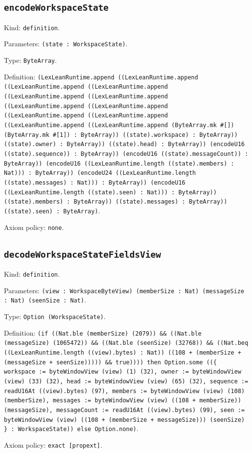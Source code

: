 \documentclass[11pt]{article}
\begin{document}
\subsection*{\texttt{encodeWorkspaceState}}
\noindent Kind: \texttt{definition}.\par
\noindent Parameters: \texttt{(state : WorkspaceState)}.\par
\noindent Type: \texttt{ByteArray}.\par
\noindent Definition: \texttt{(LexLeanRuntime.append ((LexLeanRuntime.append ((LexLeanRuntime.append ((LexLeanRuntime.append ((LexLeanRuntime.append ((LexLeanRuntime.append ((LexLeanRuntime.append ((LexLeanRuntime.append ((LexLeanRuntime.append ((LexLeanRuntime.append ((LexLeanRuntime.append ((LexLeanRuntime.append (ByteArray.mk \#[]) (ByteArray.mk \#[1]) : ByteArray)) ((state).workspace) : ByteArray)) ((state).owner) : ByteArray)) ((state).head) : ByteArray)) (encodeU16 ((state).sequence)) : ByteArray)) (encodeU16 ((state).messageCount)) : ByteArray)) (encodeU16 ((LexLeanRuntime.length ((state).members) : Nat))) : ByteArray)) (encodeU24 ((LexLeanRuntime.length ((state).messages) : Nat))) : ByteArray)) (encodeU16 ((LexLeanRuntime.length ((state).seen) : Nat))) : ByteArray)) ((state).members) : ByteArray)) ((state).messages) : ByteArray)) ((state).seen) : ByteArray)}.\par
\noindent Axiom policy: \texttt{none}.\par
\subsection*{\texttt{decodeWorkspaceStateFieldsView}}
\noindent Kind: \texttt{definition}.\par
\noindent Parameters: \texttt{(view : WorkspaceByteView) (memberSize : Nat) (messageSize : Nat) (seenSize : Nat)}.\par
\noindent Type: \texttt{Option (WorkspaceState)}.\par
\noindent Definition: \texttt{(if ((Nat.ble (memberSize) (2079)) \&\& ((Nat.ble (messageSize) (1065472)) \&\& ((Nat.ble (seenSize) (32768)) \&\& ((Nat.beq ((LexLeanRuntime.length ((view).bytes) : Nat)) ((108 + (memberSize + (messageSize + seenSize))))) \&\& true)))) then Option.some ((\{ workspace := byteWindowView (view) (1) (32), owner := byteWindowView (view) (33) (32), head := byteWindowView (view) (65) (32), sequence := readU16At ((view).bytes) (97), members := byteWindowView (view) (108) (memberSize), messages := byteWindowView (view) ((108 + memberSize)) (messageSize), messageCount := readU16At ((view).bytes) (99), seen := byteWindowView (view) ((108 + (memberSize + messageSize))) (seenSize) \} : WorkspaceState)) else Option.none)}.\par
\noindent Axiom policy: \texttt{exact [propext]}.\par
\end{document}
